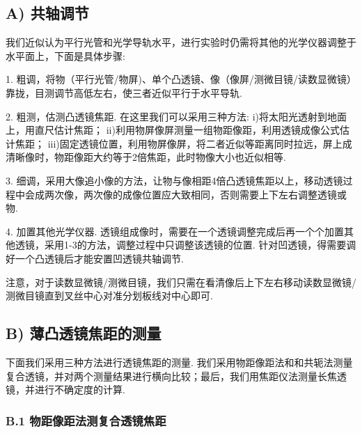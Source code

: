 \documentclass[UTF8]{ctexart}
\begin{document}
\subsection*{ A) 共轴调节}
我们近似认为平行光管和光学导轨水平，进行实验时仍需将其他的光学仪器调整于水平面上，下面是具体步骤:\par
1. 粗调，将物（平行光管/物屏)、单个凸透镜、像（像屏/测微目镜/读数显微镜）靠拢，目测调节高低左右，使三者近似平行于水平导轨.\par
2. 粗测，估测凸透镜焦距. 在这里我们可以采用三种方法: i)将太阳光透射到地面上，用直尺估计焦距； ii)利用物屏像屏测量一组物距像距，利用透镜成像公式估计焦距； iii)固定透镜位置，利用物屏像屏，将二者近似等距离同时拉远，屏上成清晰像时，物距像距大约等于2倍焦距，此时物像大小也近似相等.\par
3. 细调，采用大像追小像的方法，让物与像相距4倍凸透镜焦距以上，移动透镜过程中会成两次像，两次像的成像位置应大致相同，否则需要上下左右调整透镜或物.\par
4. 加置其他光学仪器. 透镜组成像时，需要在一个透镜调整完成后再一个个加置其他透镜，采用1-3的方法，调整过程中只调整该透镜的位置. 针对凹透镜，得需要调好一个凸透镜后才能安置凹透镜共轴调节.\par
注意，对于读数显微镜/测微目镜，我们只需在看清像后上下左右移动读数显微镜/测微目镜直到叉丝中心对准分划板线对中心即可.


\subsection*{ B) 薄凸透镜焦距的测量}
下面我们采用三种方法进行透镜焦距的测量. 我们采用物距像距法和和共轭法测量复合透镜，并对两个测量结果进行横向比较；最后，我们用焦距仪法测量长焦透镜，并进行不确定度的计算.\par
\subsubsection*{B.1 物距像距法测复合透镜焦距}
\end{document}
